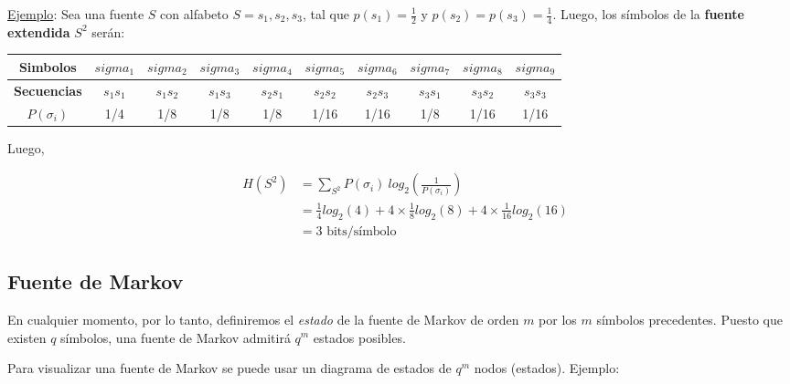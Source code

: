 \documentclass[]{article}
\begin{document}
\underline{Ejemplo}:
Sea una fuente $S$ con alfabeto $S = {s_1, s_2, s_3}$, tal que $p(s_1) = \frac{1}{2}$ y $p(s_2) = p(s_3) = \frac{1}{4}$. Luego, los símbolos de la \textbf{fuente extendida} $S^2$ serán:

\begin{center}
    \begin{table}[h]
        \begin{tabular}{|c|c|c|c|c|c|c|c|c|c|}
            \hline
            \textbf{Simbolos}   & $sigma_1$ & $sigma_2$ & $sigma_3$ & \multicolumn{1}{c|}{$sigma_4$} & $sigma_5$ & $sigma_6$ & $sigma_7$ & $sigma_8$ & $sigma_9$ \\ \hline
            \textbf{Secuencias} & $s_1s_1$  & $s_1s_2$  & $s_1s_3$  & $s_2s_1$                       & $s_2s_2$  & $s_2s_3$  & $s_3s_1$  & $s_3s_2$  & $s_3s_3$  \\ \hline
            $P(\sigma_i)$       & 1/4       & 1/8       & 1/8       & 1/8                            & 1/16      & 1/16      & 1/8       & 1/16      & 1/16      \\ \hline
        \end{tabular}
    \end{table}
\end{center}

Luego,

\begin{eqnarray*}
    & \displaystyle H(S^2) & = \sum_{S^2} P(\sigma_i)\ log_2\left(\frac{1}{P(\sigma_i)}\right)\\
    & & = \frac{1}{4} log_2(4) + 4\times \frac{1}{8} log_2(8) + 4\times \frac{1}{16} log_2(16)\\
    & & = 3 \text{ bits/símbolo}
\end{eqnarray*}

\subsection{Fuente de Markov}

En cualquier momento, por lo tanto, definiremos el \emph{estado} de la fuente de Markov de orden $m$ por los $m$ símbolos precedentes. Puesto que existen $q$ símbolos, una fuente de Markov admitirá $q^m$ estados posibles.

Para visualizar una fuente de Markov se puede usar un diagrama de estados de $q^m$ nodos (estados). Ejemplo:
\end{document}
